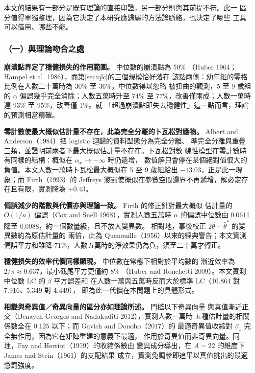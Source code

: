 \documentclass[UTF8, fontset=macnew, a4paper, 12pt]{ctexart}
\begin{document}
本文的結果有一部分是既有理論的直接印證，另一部分則與其前提不符。此一
區分值得單獨整理，因為它決定了本研究應歸屬的方法論脈絡，也決定了哪些
工具可以借用、哪些不能。

\subsubsection{（一）與理論吻合之處}

\textbf{崩潰點界定了穩健損失的作用範圍。} 中位數的崩潰點為 50\%
（Huber 1964；Hampel et al. 1986），而第\ref{sec:qlc}的三個規模恰好落在
該點兩側：幼年組的零格比例在人數二十萬時為 30\% 至 36\%，中位數得以忽略
被扭曲的觀測，5 至 9 歲組的 $\alpha$ 偏誤幾乎完全消除；人數五萬時升至
74\% 至 77\%，改善僅兩成；人數一萬時達 93\% 至 95\%，改善僅 1\%。就
「超過崩潰點即失去穩健性」這一點而言，理論的預測相當精確。

\textbf{零計數使最大概似估計量不存在，此為完全分離的卜瓦松對應物。}
Albert and Anderson（1984）把 logistic 迴歸的資料型態分為完全分離、
準完全分離與重疊三類，並證明前兩者下最大概似估計量不存在。卜瓦松對數
線性模型在零計數時有同樣的結構：概似在 $\alpha_x\to-\infty$ 時仍遞增，
數值解只會停在某個絕對值很大的負值。本文人數一萬時卜瓦松最大概似在
5 至 9 歲組給出 $-13.03$，正是此一現象；而 Firth（1993）的 Jeffreys
懲罰使概似在參數空間邊界不再遞增，解必定存在且有限，實測降為 $+0.43$。

\textbf{偏誤減少的階數與代價亦與理論一致。} Firth 的修正針對最大概似
估計量的 $O(1/n)$ 偏誤（Cox and Snell 1968），實測人數五萬時 $\alpha$
的偏誤中位數由 0.0611 降至 0.0088，約一個數量級，且不放大變異數。
相對地，事後校正 $2\hat\theta-\bar\theta^{*}$ 的變異數約為原估計量的
兩倍，此為 Quenouille（1956）以來的經典警告；本文實測偏誤平方和雖降
71\%，人數五萬時的淨效果仍為負，須至二十萬才轉正。

\textbf{穩健損失的效率代價同樣顯現。} 中位數在常態下相對於平均數的
漸近效率為 $2/\pi\approx0.637$，最小截尾平方更僅約 8\%
（Huber and Ronchetti 2009）。本文實測中位數 LC 的 $\beta$ 平方誤差和
在人數一萬與五萬時反而大於標準 LC（10.864 對 7.916、5.349 對 4.449），
即為此一代價在本問題上的具體形式。

\textbf{相變與奇異值／奇異向量的區分亦如理論所述。} 門檻以下奇異向量
與真值漸近正交（Benaych-Georges and Nadakuditi 2012），實測人數一萬時
五種估計量的相關係數全在 0.125 以下；而 Gavish and Donoho（2017）的
最適奇異值收縮對 $\beta_x$ 完全無作用，因為它在矩陣重建的意義下最適，
作用於奇異值而非奇異向量。同理，Fay and Herriot（1979）的收縮係數由
變異成分導出，在 $A=22$ 的維度下 James and Stein（1961）的支配結果
成立，實測免調參即追平以真值挑出的最適懲罰強度。
\end{document}
